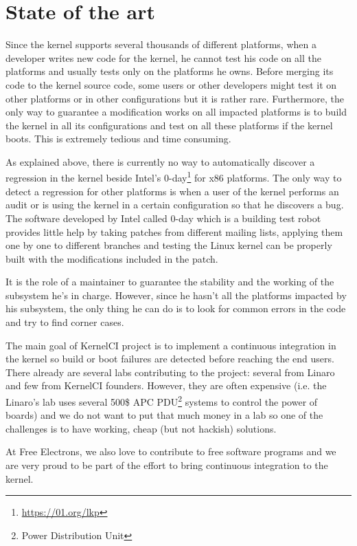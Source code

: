 \section{State of the art}
Since the kernel supports several thousands of different platforms, when a developer writes new code for the kernel, he cannot test his code on all the platforms and usually tests only on the platforms he owns. Before merging its code to the kernel source code, some users or other developers might test it on other platforms or in other configurations but it is rather rare. Furthermore, the only way to guarantee a modification works on all impacted platforms is to build the kernel in all its configurations and test on all these platforms if the kernel boots. This is extremely tedious and time consuming.

As explained above, there is currently no way to automatically discover a regression in the kernel beside Intel's 0-day\footnote{\url{https://01.org/lkp}} for x86 platforms. The only way to detect a regression for other platforms is when a user of the kernel performs an audit or is using the kernel in a certain configuration so that he discovers a bug. The software developed by Intel called 0-day which is a building test robot provides little help by taking patches from different mailing lists, applying them one by one to different branches and testing the Linux kernel can be properly built with the modifications included in the patch.

It is the role of a maintainer to guarantee the stability and the working of the subsystem he's in charge. However, since he hasn't all the platforms impacted by his subsystem, the only thing he can do is to look for common errors in the code and try to find corner cases.

The main goal of KernelCI project is to implement a continuous integration in the kernel so build or boot failures are detected before reaching the end users. There already are several labs contributing to the project: several from Linaro and few from KernelCI founders. However, they are often expensive (i.e. the Linaro's lab uses several 500\$ APC PDU\footnote{Power Distribution Unit} systems to control the power of boards) and we do not want to put that much money in a lab so one of the challenges is to have working, cheap (but not hackish) solutions.

At Free Electrons, we also love to contribute to free software programs and we are very proud to be part of the effort to bring continuous integration to the kernel.

